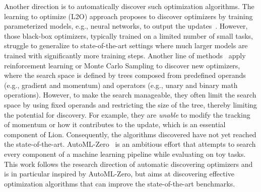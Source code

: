 \documentclass{article}
\newcommand{\name}{Lion}
\begin{document}
Another direction is to automatically discover such optimization algorithms.
The learning to optimize (L2O) approach proposes to discover optimizers by training parameterized models, e.g., neural networks, to output the updates~\citep{andrychowicz2016l2l, metz2019understandl2l, li2016learning, metz2022velo}.
However, those black-box optimizers, typically trained on a limited number of small tasks, struggle to generalize to state-of-the-art settings where much larger models are trained with significantly more training steps. Another line of methods~\citep{bello2017nos, wang2022efficient} apply reinforcement learning or Monte Carlo Sampling to discover new optimizers, where the search space is defined by trees composed from predefined operands (e.g., gradient and momentum) and operators (e.g., unary and binary math operations). 
However, to make the search manageable, they often limit the search space by using fixed operands and restricting the size of the tree, thereby limiting the potential for discovery. For example, they are \textit{unable} to modify the tracking of momentum or how it contributes to the update, which is an essential component of \name{}.
Consequently, the algorithms discovered have not yet reached the state-of-the-art. AutoML-Zero~\citep{real2020automl} is an ambitious effort that attempts to search every component of a machine learning pipeline while evaluating on toy tasks. This work follows the research direction of automatic discovering optimizers and is in particular inspired by AutoML-Zero, but aims at discovering effective optimization algorithms that can improve the state-of-the-art benchmarks.






\end{document}
